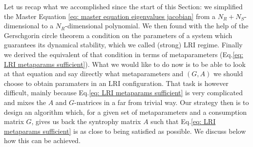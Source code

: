 \documentclass[12pt, titlepage]{report}
\begin{document}
%
Let us recap what we accomplished since the start of this Section: we simplified the Master Equation \eqref{eq: master equation eigenvalues jacobian} from a $N_R+N_S$-dimensional to a $N_R$-dimensional polynomial. We then found with the help of the Gerschgorin circle theorem a condition on the parameters of a system which guarantees its dynamical stability, which we called (strong) LRI regime. Finally we derived the equivalent of that condition in terms of metaparameters (Eq.\ref{eq: LRI metaparams sufficient}). What we would like to do now is to be able to look at that equation and say directly what metaparameters and $(G,A)$ we should choose to obtain paramaters in an LRI configuration. That task is however difficult, mainly because Eq.\eqref{eq: LRI metaparams sufficient} is very complicated and mixes the $A$ and $G$-matrices in a far from trivial way. Our strategy then is to design an algorithm which, for a given set of metaparameters and a consumption matrix $G$, gives us back the syntrophy matrix $A$ such that Eq.\eqref{eq: LRI metaparams sufficient} is as close to being satisfied as possible. We discuss below how this can be achieved.
\end{document}
